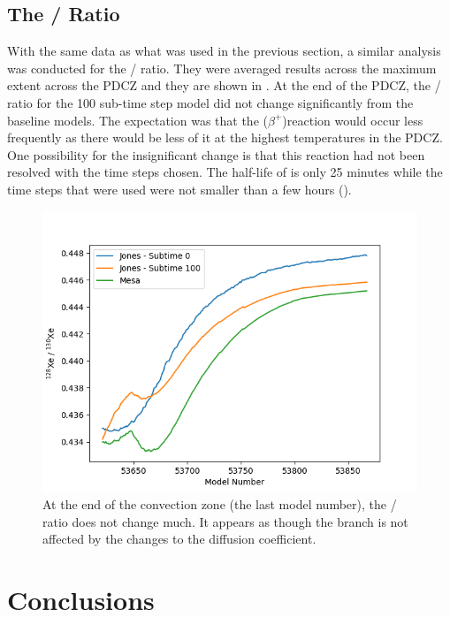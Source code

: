 \documentclass[fleqn,usenatbib]{mnras}
\begin{document}
\subsection{The \xenon[128] / \xenon[130] Ratio}

With the same data as what was used in the previous section, a similar analysis was conducted for the \xenon[128] / \xenon[130] ratio. They were averaged results across the maximum extent across the PDCZ and they are shown in . At the end of the PDCZ, the \xenon[128] / \xenon[130] ratio for the 100 sub-time step model did not change significantly from the baseline models. The expectation was that the \iodine[128]($\beta^{+}$)\tellurium[128] reaction would occur less frequently as there would be less of it at the highest temperatures in the PDCZ. One possibility for the insignificant change is that this reaction had not been resolved with the time steps chosen. The half-life of \iodine[128] is only 25 minutes while the time steps that were used were not smaller than a few hours ().

\begin{figure}
   \includegraphics[width=1\columnwidth]{figs/JonesS1_xe2.png}
   \caption{At the end of the convection zone (the last model number), the \xenon[128] / \xenon[130] ratio does not change much. It appears as though the \iodine[128] branch is not affected by the changes to the diffusion coefficient.}
\end{figure}

\section{Conclusions}
\end{document}
